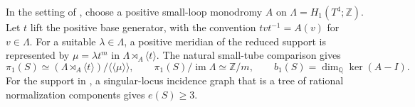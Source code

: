 \begin{proposition}\hypertarget{tag-02YG}{}\label{night:P4R.4}\label{stmt:P4R.4}

In the setting of , choose a positive small-loop
monodromy $A$ on $\Lambda=H_1(T^4;\mathbb Z)$.
Let $t$ lift the positive base generator, with the convention
$tvt^{-1}=A(v)$ for $v\in\Lambda$.
For a suitable $\lambda\in\Lambda$, a positive
meridian of the reduced support is represented by
$\mu=\lambda t^m$ in $\Lambda\rtimes_A\langle t\rangle$.
The natural small-tube comparison gives
\[
 \pi_1(S)\simeq
 (\Lambda\rtimes_A\langle t\rangle)/\langle\!\langle\mu\rangle\!\rangle,
 \qquad
 \pi_1(S)/\operatorname{im}\Lambda\simeq\mathbb Z/m,
 \qquad
 b_1(S)=\dim_{\mathbb Q}\ker(A-I).
\]
For the support in , a singular-locus incidence
graph that is a tree of rational normalization
components gives $e(S)\ge3$.
\end{proposition}
